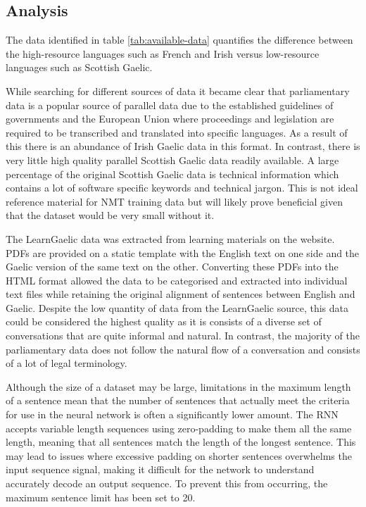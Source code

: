 \subsection{Analysis}

The data identified in table \ref{tab:available-data} quantifies the difference between the high-resource languages such as French and Irish versus low-resource languages such as Scottish Gaelic. 

While searching for different sources of data it became clear that parliamentary data is a popular source of parallel data due to the established guidelines of governments and the European Union where proceedings and legislation are required to be transcribed and translated into specific languages. As a result of this there is an abundance of Irish Gaelic data in this format.
In contrast, there is very little high quality parallel Scottish Gaelic data readily available. A large percentage of the original Scottish Gaelic data is technical information which contains a lot of software specific keywords and technical jargon. This is not ideal reference material for \acrshort{NMT} training data but will likely prove beneficial given that the dataset would be very small without it.

The LearnGaelic data was extracted from learning materials on the \cite{learn_gaelic_2019} website. PDFs are provided on a static template with the English text on one side and the Gaelic version of the same text on the other. Converting these PDFs into the HTML format allowed the data to be categorised and extracted into individual text files while retaining the original alignment of sentences between English and Gaelic.
Despite the low quantity of data from the LearnGaelic source, this data could be considered the highest quality as it is consists of a diverse set of conversations that are quite informal and natural. In contrast, the majority of the parliamentary data does not follow the natural flow of a conversation and consists of a lot of legal terminology.



Although the size of a dataset may be large, limitations in the maximum length of a sentence mean that the number of sentences that actually meet the criteria for use in the neural network is often a significantly lower amount. The RNN accepts variable length sequences using zero-padding to make them all the same length, meaning that all sentences match the length of the longest sentence. This may lead to issues where excessive padding on shorter sentences overwhelms the input sequence signal, making it difficult for the network to understand accurately decode an output sequence. To prevent this from occurring, the maximum sentence limit has been set to 20.

